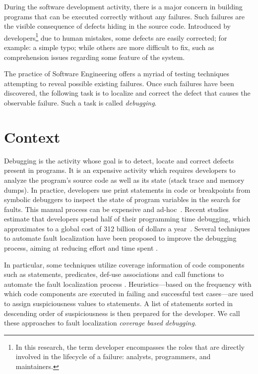During the software development activity, there is a major concern in building
programs that can be executed correctly without any failures. Such failures are
the visible consequence of defects hiding in the source code.
Introduced  by developers\footnote{In this research, the term developer
encompasses the roles that are directly involved in the lifecycle of a failure:
analysts, programmers, and maintainers.} due to  human mistakes, some defects
are easily corrected; for example: a simple typo; while others are more
difficult to fix, such as comprehension issues regarding some feature of the
system.

The practice of Software Engineering offers a myriad of testing techniques
attempting to reveal possible existing failures. Once such failures have been
discovered, the following task is to localize and correct the defect that causes
the observable failure. Such a task is called \textit{debugging}.

\section{Context}

Debugging  is the activity whose goal is to detect, locate and correct defects
present in programs. It is an expensive activity which requires developers to
analyze the program's source code as well as its state (stack
trace and memory dumps). In practice, developers use print statements in
code or breakpoints from symbolic debuggers to inspect the state of program
variables in the search for faults. This manual process can be expensive and
ad-hoc~\cite{jones2007}. Recent studies estimate that developers spend half of
their programming time debugging, which approximates to a global cost of 312
billion of dollars a year~\cite{britton2013reversible}.
Several techniques to automate fault localization have been proposed to improve
the debugging process, aiming at reducing effort and time spent
\cite{jones2002visualization,agrawal1995,wotawa2002,zeller2002,renieris2003}.

In particular, some techniques utilize coverage information of code components
such as statements, predicates, def-use associations and call functions to
automate the fault localization process
\cite{jones2002visualization,agrawal1995,wotawa2002}.  Heuristics---based on the
frequency with which code components  are executed in failing and successful
test cases---are used to assign suspiciousness values to statements.  A list of
statements sorted in descending order of suspiciousness is then prepared for the
developer. We call these approaches to fault localization \textit{coverage based
debugging}.

